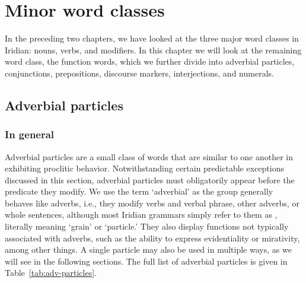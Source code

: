 \chapter{Minor word classes}\label{chap:minor}

In the preceding two chapters, we have looked at the three major word classes in Iridian: nouns, verbs, and modifiers. In this chapter we will look at the remaining word class, the function words, which we further divide into adverbial particles, conjunctions, prepositions, discourse markers, interjections, and numerals.

\section{Adverbial particles}\label{sec:adv-particles}

\subsection{In general}\label{sec:adv-particles-general}

Adverbial particles are a small class of words that are similar to one another
in exhibiting proclitic behavior. Notwithstanding certain predictable exceptions
discussed in this section, adverbial particles must obligatorily appear before
the predicate they modify. We use the term `adverbial' as the group generally
behaves like adverbs, i.e., they modify verbs and verbal phrase, other adverbs,
or whole sentences, although most Iridian grammars simply refer to them as
, literally meaning `grain' or `particle.' They also display functions
not typically associated with adverbs, such as the ability to express
evidentiality or mirativity, among other things. A single particle may also be
used in multiple ways, as we will see in the following sections. The full list
of adverbial particles is given in Table~\ref{tab:adv-particles}.

